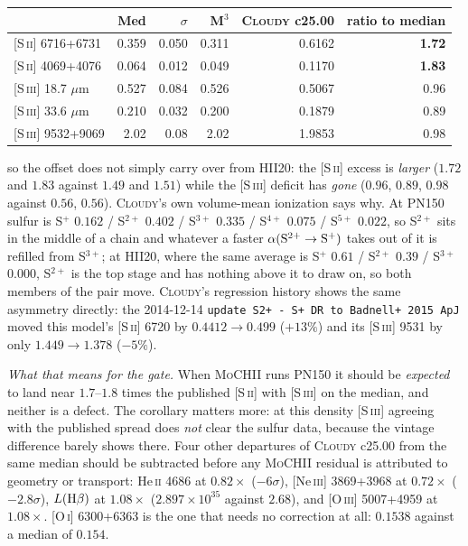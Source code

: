 \documentclass[english,a4paper]{my_memo}
\newcommand{\code}[1]{\texttt{#1}}
\newcommand{\MoCHII}{\textsc{MoCHII}}
\newcommand{\Mthree}{M$^3$}
\newcommand{\Cloudy}{\textsc{Cloudy}}
\begin{document}
\begingroup\small
\begin{center}
\begin{tabular}{lrrrrr}
\toprule
& Med & $\sigma$ & \Mthree{} & \Cloudy{} c25.00 & ratio to median \\
\midrule
{}[S\,\textsc{ii}] 6716+6731    & 0.359 & 0.050 & 0.311 & 0.6162 & \textbf{1.72} \\
{}[S\,\textsc{ii}] 4069+4076    & 0.064 & 0.012 & 0.049 & 0.1170 & \textbf{1.83} \\
{}[S\,\textsc{iii}] 18.7 $\mu$m & 0.527 & 0.084 & 0.526 & 0.5067 & 0.96 \\
{}[S\,\textsc{iii}] 33.6 $\mu$m & 0.210 & 0.032 & 0.200 & 0.1879 & 0.89 \\
{}[S\,\textsc{iii}] 9532+9069   & 2.02  & 0.08  & 2.02  & 1.9853 & 0.98 \\
\bottomrule
\end{tabular}
\end{center}
\endgroup

\noindent
so the offset does not simply carry over from HII20: the [S\,\textsc{ii}]
excess is \emph{larger} ($1.72$ and $1.83$ against $1.49$ and $1.51$) while
the [S\,\textsc{iii}] deficit has \emph{gone} ($0.96$, $0.89$, $0.98$
against $0.56$, $0.56$).  \Cloudy{}'s own volume-mean ionization says why.
At PN150 sulfur is S$^+$ $0.162$ / S$^{2+}$ $0.402$ / S$^{3+}$ $0.335$ /
S$^{4+}$ $0.075$ / S$^{5+}$ $0.022$, so S$^{2+}$ sits in the middle of a
chain and whatever a faster $\alpha({\rm S^{2+}}\rightarrow{\rm S^+})$
takes out of it is refilled from S$^{3+}$; at HII20, where the same average
is S$^+$ $0.61$ / S$^{2+}$ $0.39$ / S$^{3+}$ $0.000$, S$^{2+}$ is the top
stage and has nothing above it to draw on, so both members of the pair
move.  \Cloudy{}'s regression history shows the same asymmetry directly:
the 2014-12-14 \code{update S2+ - S+ DR to Badnell+ 2015 ApJ} moved this
model's [S\,\textsc{ii}] 6720 by $0.4412 \rightarrow 0.499$ ($+13\%$) and
its [S\,\textsc{iii}] 9531 by only $1.449 \rightarrow 1.378$ ($-5\%$).

\emph{What that means for the gate.}  When \MoCHII{} runs PN150 it should
be \emph{expected} to land near $1.7$--$1.8$ times the published
[S\,\textsc{ii}] with [S\,\textsc{iii}] on the median, and neither is a
defect.  The corollary matters more: at this density [S\,\textsc{iii}]
agreeing with the published spread does \emph{not} clear the sulfur data,
because the vintage difference barely shows there.  Four other departures
of \Cloudy{} c25.00 from the same median should be subtracted before any
\MoCHII{} residual is attributed to geometry or transport: He\,\textsc{ii}
4686 at $0.82\times$ ($-6\sigma$), [Ne\,\textsc{iii}] 3869+3968 at
$0.72\times$ ($-2.8\sigma$), $L({\rm H}\beta)$ at $1.08\times$
($2.897{\times}10^{35}$ against $2.68$), and [O\,\textsc{iii}] 5007+4959 at
$1.08\times$.  [O\,\textsc{i}] 6300+6363 is the one that needs no
correction at all: $0.1538$ against a median of $0.154$.
\end{document}
